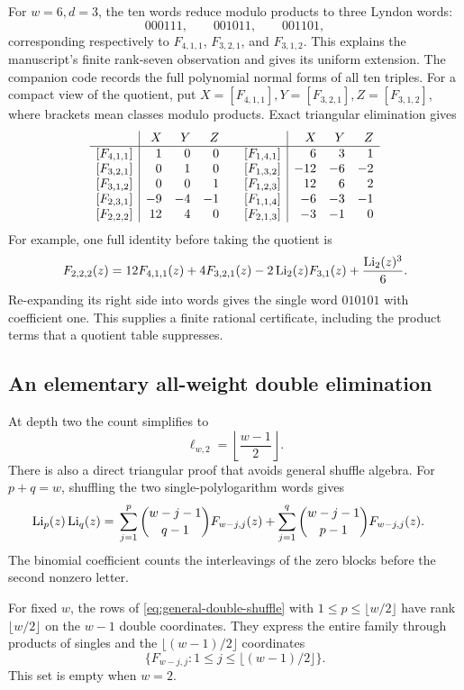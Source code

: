 For \(w=6,d=3\), the ten words reduce modulo products to three Lyndon
words:
\[
000111,\qquad001011,\qquad001101,
\]
corresponding respectively to \(F_{4,1,1}\), \(F_{3,2,1}\),
and \(F_{3,1,2}\). This explains the manuscript's finite rank-seven
observation and gives its uniform extension.
The companion code records the full polynomial normal forms of all ten
triples. For a compact view of the quotient, put
\(X=[F_{4,1,1}],Y=[F_{3,2,1}],Z=[F_{3,1,2}]\), where brackets mean
classes modulo products. Exact triangular elimination gives
\[
\begin{array}{c|rrr@{\qquad}c|rrr}
 &X&Y&Z&&X&Y&Z\\ \hline
{}[F_{4,1,1}]&1&0&0 &[F_{1,4,1}]&6&3&1\\
{}[F_{3,2,1}]&0&1&0 &[F_{1,3,2}]&-12&-6&-2\\
{}[F_{3,1,2}]&0&0&1 &[F_{1,2,3}]&12&6&2\\
{}[F_{2,3,1}]&-9&-4&-1 &[F_{1,1,4}]&-6&-3&-1\\
{}[F_{2,2,2}]&12&4&0 &[F_{2,1,3}]&-3&-1&0
\end{array}
\]
For example, one full identity before taking the quotient is
\begin{equation}
F_{2,2,2}(z)=12F_{4,1,1}(z)+4F_{3,2,1}(z)
-2\operatorname{Li}_2(z)F_{3,1}(z)+\frac{\operatorname{Li}_2(z)^3}{6}.
\label{eq:full-222}
\end{equation}
Re-expanding its right side into words gives the single word \(010101\)
with coefficient one. This supplies a finite rational certificate,
including the product terms that a quotient table suppresses.

\subsection{An elementary all-weight double elimination}

At depth two the count simplifies to
\[
\ell_{w,2}=\left\lfloor\frac{w-1}{2}\right\rfloor.
\]
There is also a direct triangular proof that avoids general shuffle
algebra. For \(p+q=w\), shuffling the two single-polylogarithm words gives
\begin{align}
\operatorname{Li}_p(z)\operatorname{Li}_q(z)
={}&\sum_{j=1}^{p}\binom{w-j-1}{q-1}F_{w-j,j}(z)
+\sum_{j=1}^{q}\binom{w-j-1}{p-1}F_{w-j,j}(z).
\label{eq:general-double-shuffle}
\end{align}
The binomial coefficient counts the interleavings of the zero blocks
before the second nonzero letter.

\begin{proposition}\label{prop:double-rank}
For fixed \(w\), the rows of
\eqref{eq:general-double-shuffle} with
\(1\le p\le\lfloor w/2\rfloor\) have rank
\(\lfloor w/2\rfloor\) on the \(w-1\) double coordinates.
They express the entire family through products of singles and the
\(\lfloor(w-1)/2\rfloor\) coordinates
\[
\{F_{w-j,j}:1\le j\le\lfloor(w-1)/2\rfloor\}.
\]
This set is empty when \(w=2\).
\end{proposition}

